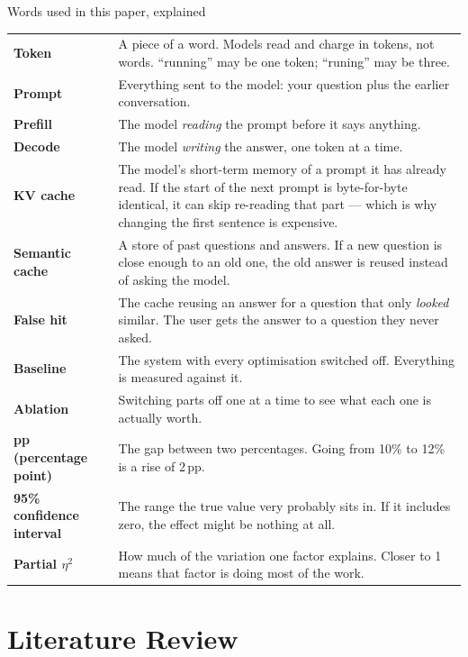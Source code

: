 \documentclass[11pt,a4paper]{article}
\begin{document}
\begin{keybox}{Words used in this paper, explained}
\small
\begin{tabularx}{\textwidth}{@{}L{3.0cm} X@{}}
\textbf{Token} & A piece of a word. Models read and charge in tokens, not words. ``running'' may be one token; ``runing'' may be three. \\
\textbf{Prompt} & Everything sent to the model: your question plus the earlier conversation. \\
\textbf{Prefill} & The model \emph{reading} the prompt before it says anything. \\
\textbf{Decode} & The model \emph{writing} the answer, one token at a time. \\
\textbf{KV cache} & The model's short-term memory of a prompt it has already read. If the start of the next prompt is byte-for-byte identical, it can skip re-reading that part --- which is why changing the first sentence is expensive. \\
\textbf{Semantic cache} & A store of past questions and answers. If a new question is close enough to an old one, the old answer is reused instead of asking the model. \\
\textbf{False hit} & The cache reusing an answer for a question that only \emph{looked} similar. The user gets the answer to a question they never asked. \\
\textbf{Baseline} & The system with every optimisation switched off. Everything is measured against it. \\
\textbf{Ablation} & Switching parts off one at a time to see what each one is actually worth. \\
\textbf{pp (percentage point)} & The gap between two percentages. Going from 10\% to 12\% is a rise of 2\,pp. \\
\textbf{95\% confidence interval} & The range the true value very probably sits in. If it includes zero, the effect might be nothing at all. \\
\textbf{Partial $\eta^2$} & How much of the variation one factor explains. Closer to 1 means that factor is doing most of the work. \\
\end{tabularx}
\end{keybox}

\section{Literature Review}
\label{sec:lit}
\end{document}
